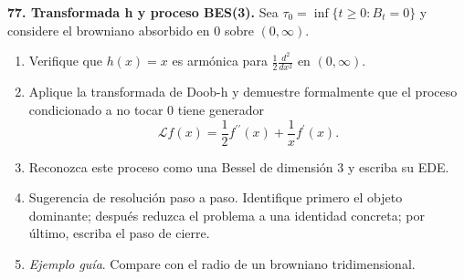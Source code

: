 \documentclass[11pt, letterpaper]{article}
\begin{document}
\newpage

\begin{ejercicio}
    \textbf{77. Transformada h y proceso BES(3).} Sea $\tau_{0}=\inf\{t\ge 0:B_{t}=0\}$ y considere el browniano absorbido en 0 sobre $(0,\infty)$.
    \begin{enumerate}
        \item Verifique que $h(x)=x$ es armónica para $\frac{1}{2}\frac{d^{2}}{dx^{2}}$ en $(0,\infty)$.
        \item Aplique la transformada de Doob-h y demuestre formalmente que el proceso condicionado a no tocar 0 tiene generador
        \[ \mathcal{L}f(x)=\frac{1}{2}f^{\prime\prime}(x)+\frac{1}{x}f^{\prime}(x). \]
        \item Reconozca este proceso como una Bessel de dimensión 3 y escriba su EDE.
        \item Sugerencia de resolución paso a paso. Identifique primero el objeto dominante; después reduzca el problema a una identidad concreta; por último, escriba el paso de cierre.
        \item \textit{Ejemplo guía}. Compare con el radio de un browniano tridimensional.
    \end{enumerate}
\end{ejercicio}

\vspace{5mm}
\end{document}
